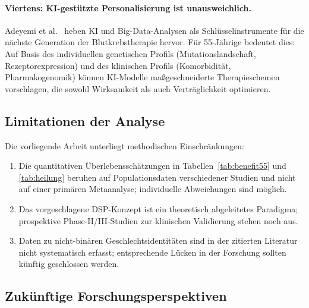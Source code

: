 ﻿\documentclass[12pt,a4paper]{article}
\theoremstyle{definition}
\begin{document}
\paragraph{Viertens: KI-gestützte Personalisierung ist unausweichlich.}
Adeyemi et al.\ \cite{adeyemi2025} heben KI und Big-Data-Analysen als
Schlüsselinstrumente für die nächste Generation der Blutkrebstherapie hervor.
Für 55-Jährige bedeutet dies: Auf Basis des individuellen genetischen Profils
(Mutationslandschaft, Rezeptorexpression) und des klinischen Profils (Komorbidität,
Pharmakogenomik) können KI-Modelle maßgeschneiderte Therapieschemen vorschlagen,
die sowohl Wirksamkeit als auch Verträglichkeit optimieren.

\subsection{Limitationen der Analyse}

Die vorliegende Arbeit unterliegt methodischen Einschränkungen:
\begin{enumerate}
  \item Die quantitativen Überlebensschätzungen in Tabellen~\ref{tab:benefit55}
        und \ref{tab:heilung} beruhen auf Populationsdaten verschiedener Studien
        und nicht auf einer primären Metaanalyse; individuelle Abweichungen sind
        möglich.
  \item Das vorgeschlagene DSP-Konzept ist ein theoretisch abgeleitetes Paradigma;
        prospektive Phase-II/III-Studien zur klinischen Validierung stehen
        noch aus.
  \item Daten zu nicht-binären Geschlechtsidentitäten sind in der zitierten
        Literatur nicht systematisch erfasst; entsprechende Lücken in der
        Forschung sollten künftig geschlossen werden.
\end{enumerate}

\subsection{Zukünftige Forschungsperspektiven}
\end{document}
